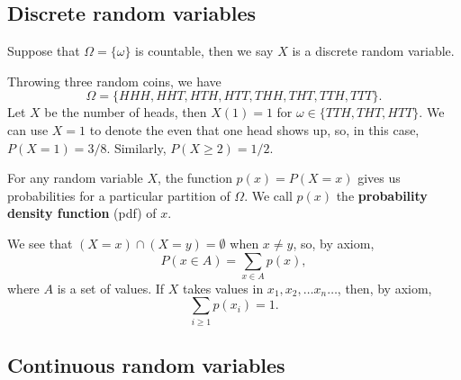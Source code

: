 \documentclass[letter-paper]{tufte-book}
\newenvironment{example}[1][Example]{\begin{trivlist}
\item[\hskip \labelsep {\bfseries #1}]}{\end{trivlist}}
\newcommand\Def[1]{\textbf{#1}}
\begin{document}

\subsection{Discrete random variables}

Suppose that $\Omega=\{\omega\}$ is countable, then we say $X$ is a discrete
random variable.
\begin{example}
  Throwing three random coins, we have
  \begin{equation*}
    \Omega=\{HHH, HHT, HTH, HTT, THH, THT, TTH, TTT\}.
  \end{equation*}
  Let $X$ be the number of heads, then $X(1)=1$ for $\omega\in\{TTH, THT,
  HTT\}$. We can use $X=1$ to denote the even that one head shows up, so, in
  this case, $P(X=1) = 3/8$. Similarly, $P(X\geq2) = 1/2$.
\end{example}

For any random variable $X$, the function $p(x) = P(X=x)$ gives us probabilities
for a particular partition of $\Omega$. We call $p(x)$ the
\Def{probability density function} (pdf) of $x$.

We see that $(X=x) \cap (X=y) = \emptyset$ when $x \neq y$, so, by axiom,
\begin{equation*}
  P(x \in A) = \sum_{x\in A}p(x),
\end{equation*}
where $A$ is a set of values. If $X$ takes values in $x_1,x_2,\ldots x_n\ldots$,
then, by axiom,
\begin{equation*}
  \sum_{i\geq 1} p(x_i) = 1.
\end{equation*}


\subsection{Continuous random variables}
\end{document}

